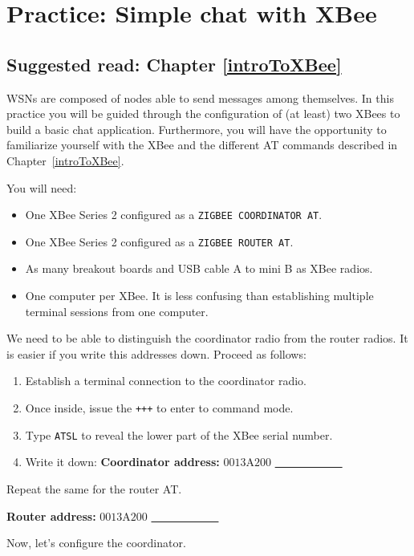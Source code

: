 \chapter{Practice: Simple chat with XBee}\label{pract:simpleChat}
\section*{Suggested read: Chapter \ref{introToXBee}}

WSNs are composed of nodes able to send messages among themselves. In this practice you will be guided through the configuration of (at least) two XBees to build a basic chat application. Furthermore, you will have the opportunity to familiarize yourself with the XBee and the different AT commands described in Chapter~\ref{introToXBee}.

You will need:

\begin{itemize}
	\item One XBee Series 2 configured as a \texttt{ZIGBEE COORDINATOR AT}.
	\item One XBee Series 2 configured as a \texttt{ZIGBEE ROUTER AT}.
	\item As many breakout boards and USB cable A to mini B as XBee radios.
	\item One computer per XBee. It is less confusing than establishing multiple terminal sessions from one computer.
\end{itemize}

We need to be able to distinguish the coordinator radio from the router radios. It is easier if you write this addresses down. Proceed as follows:

\begin{enumerate}
	\item Establish a terminal connection to the coordinator radio.
	\item Once inside, issue the \texttt{+++} to enter to command mode.
	\item Type \texttt{ATSL} to reveal the lower part of the XBee serial number.
	\item Write it down: {\bfseries Coordinator address:} $0013$A$200$ \underline{\ \ \ \ \ \ \ \ \ \ \ \ }
\end{enumerate}

Repeat the same for the router AT.

{\bfseries Router address:} $0013$A$200$ \underline{\ \ \ \ \ \ \ \ \ \ \ \ }

Now, let's configure the coordinator.

